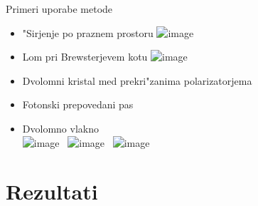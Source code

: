 \documentclass{beamer}
\begin{document}
\begin{frame}{Primeri uporabe metode}

\begin{itemize}[<+->]
 \item "Sirjenje po praznem prostoru
 \includegraphics<1>[width=.8\textwidth]{./Slike/empty}
 
 \item Lom pri Brewsterjevem kotu
 \includegraphics<2>[width=.8\textwidth]{./Slike/refraction}
 
 
  \item Dvolomni kristal med prekri"zanima polarizatorjema\\
  \only<3>{\resizebox{.7\textwidth}{!}{}}
%  

 \item Fotonski prepovedani pas \\
  
 \item Dvolomno vlakno \\[1em]
  \includegraphics<5>[width=.25\textwidth]{./Defekti/g_defect_light_0} \,
  \includegraphics<5>[angle=180,origin=c,width=.25\textwidth]{./Slike/licp_0_68} \,
  \includegraphics<5>[width=.25\textwidth]{./Slike/licp_0_78}
  
\end{itemize}

\end{frame}

\section{Rezultati}
\end{document}
